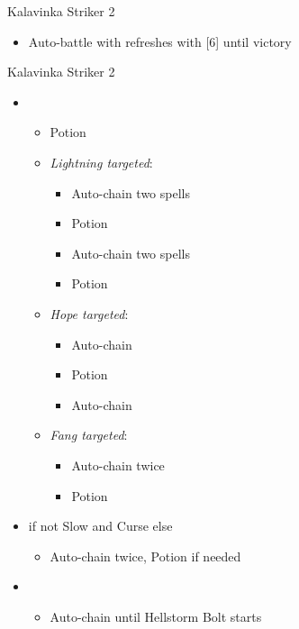 \begin{paracol}{2}
\begin{battle}{Kalavinka Striker 2}
\begin{itemize}
			      \begin{itemize}
				      \item Auto-battle with refreshes with [6] until victory
			      \end{itemize}
		\end{itemize}
	\end{battle}
	\switchcolumn
	\begin{battle}{Kalavinka Striker 2}
		\begin{itemize}
			\item \first
			      \begin{itemize}
				      \item Potion
				      \item \textit{Lightning targeted}:
				            \begin{itemize}
					            \item Auto-chain two spells
					            \item Potion
					            \item Auto-chain two spells
					            \item Potion
				            \end{itemize}
				      \item \textit{Hope targeted}:
				            \begin{itemize}
					            \item Auto-chain
					            \item Potion
					            \item Auto-chain
				            \end{itemize}
				      \item \textit{Fang targeted}:
				            \begin{itemize}
					            \item Auto-chain twice
					            \item Potion
				            \end{itemize}
			      \end{itemize}
			\item \second if not Slow and Curse else \fourth
			      \begin{itemize}
				      \item Auto-chain twice, Potion if needed
			      \end{itemize}
			\item \third
			      \begin{itemize}
				      \item Auto-chain until Hellstorm Bolt starts

\end{itemize}
\end{itemize}
\end{battle}
\end{paracol}
